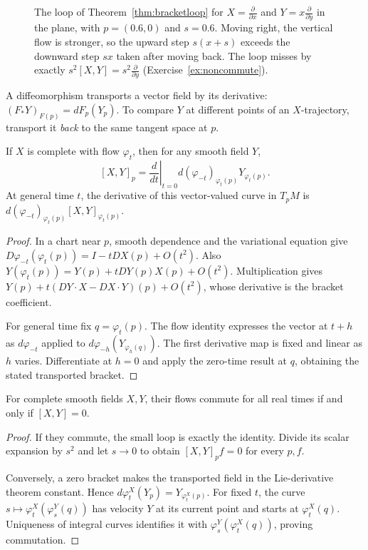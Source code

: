 \begin{figure}[ht]
\centering
{}
\caption{The loop of Theorem~\ref{thm:bracketloop} for $X=\frac\partial{\partial x}$ and $Y=x\frac\partial{\partial y}$ in the plane, with $p=(0.6,0)$ and $s=0.6$.
Moving right, the vertical flow is stronger, so the upward step $s(x+s)$ exceeds the downward step $sx$ taken after moving back. The loop misses by
exactly $s^2[X,Y]=s^2\frac\partial{\partial y}$ (Exercise~\ref{ex:noncommute}).}
\label{fig:bracketloop}
\end{figure}

A diffeomorphism transports a vector field by its derivative: $(F_*Y)_{F(p)}=dF_p(Y_p)$. To compare $Y$ at different points of an $X$-trajectory, transport it \emph{back} to the same tangent space at $p$.

\begin{theorem}\label{thm:liederiv}
If $X$ is complete with flow $\varphi_t$, then for any smooth field $Y$,
\[
[X,Y]_p=\left.\frac d{dt}\right|_{t=0}
 d(\varphi_{-t})_{\varphi_t(p)}Y_{\varphi_t(p)}.
\]
At general time $t$, the derivative of this vector-valued curve in $T_pM$ is
$d(\varphi_{-t})_{\varphi_t(p)}[X,Y]_{\varphi_t(p)}$.
\end{theorem}

\begin{proof}
In a chart near $p$, smooth dependence and the variational equation give
$D\varphi_{-t}(\varphi_t(p))=I-tDX(p)+O(t^2)$.
Also $Y(\varphi_t(p))=Y(p)+tDY(p)X(p)+O(t^2)$. Multiplication gives
$Y(p)+t(DY\cdot X-DX\cdot Y)(p)+O(t^2)$, whose derivative is the bracket coefficient.

For general time fix $q=\varphi_t(p)$. The flow identity expresses the vector at $t+h$ as $d\varphi_{-t}$ applied to $d\varphi_{-h}(Y_{\varphi_h(q)})$. The first derivative map is fixed and linear as $h$ varies. Differentiate at $h=0$ and apply the zero-time result at $q$, obtaining the stated transported bracket.
\end{proof}

\begin{theorem}\label{thm:commuting}
For complete smooth fields $X,Y$, their flows commute for all real times if and only if $[X,Y]=0$.
\end{theorem}

\begin{proof}
If they commute, the small loop is exactly the identity. Divide its scalar expansion by $s^2$ and let $s\to0$ to obtain $[X,Y]_pf=0$ for every $p,f$.

Conversely, a zero bracket makes the transported field in the Lie-derivative theorem constant. Hence $d\varphi^X_t(Y_p)=Y_{\varphi^X_t(p)}$. For fixed $t$, the curve $s\mapsto\varphi^X_t(\varphi^Y_s(q))$ has velocity $Y$ at its current point and starts at $\varphi^X_t(q)$. Uniqueness of integral curves identifies it with $\varphi^Y_s(\varphi^X_t(q))$, proving commutation.
\end{proof}

